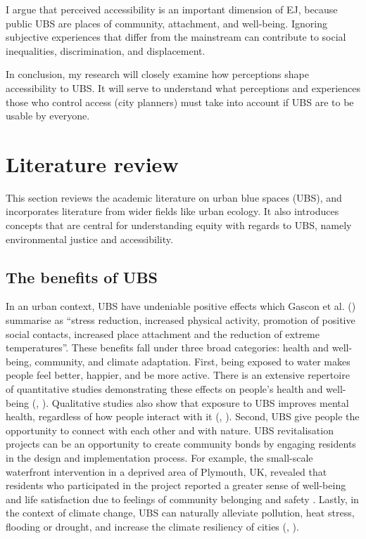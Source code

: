 \documentclass{article}
\begin{document}
I argue that perceived accessibility is an important dimension of EJ, because public UBS are places of community, attachment, and well-being. Ignoring subjective experiences that differ from the mainstream can contribute to social inequalities, discrimination, and displacement.

In conclusion, my research will closely examine how perceptions shape accessibility to UBS. It will serve to understand what perceptions and experiences those who control access (city planners) must take into account if UBS are to be usable by everyone.

\pagebreak
\section{Literature review}

This section reviews the academic literature on urban blue spaces (UBS), and incorporates literature from wider fields like urban ecology. It also introduces concepts that are central for understanding equity with regards to UBS, namely environmental justice and accessibility. 

\subsection{The benefits of UBS}

In an urban context, UBS have undeniable positive effects which Gascon et al. (\citeyear{gascon2017outdoor}) summarise as ``stress reduction, increased physical activity, promotion of positive social contacts, increased place attachment and the reduction of extreme temperatures''. These benefits fall under three broad categories: health and well-being, community, and climate adaptation.
First, being exposed to water makes people feel better, happier, and be more active. There is an extensive repertoire of quantitative studies demonstrating these effects on people's health and well-being (\cite{gascon2017outdoor}, \cite{britton2020blue}).
Qualitative studies also show that exposure to UBS improves mental health, regardless of how people interact with it (\cite{garrett2019urban}, \cite{van2021urban}).
Second, UBS give people the opportunity to connect with each other and with nature. UBS revitalisation projects can be an opportunity to create community bonds by engaging residents in the design and implementation process. For example, the small-scale waterfront intervention in a deprived area of Plymouth, UK, revealed that residents who participated in the project reported a greater sense of well-being and life satisfaction due to feelings of community belonging and safety \parencite{van2021urban}.
Lastly, in the context of climate change, UBS can naturally alleviate pollution, heat stress, flooding or drought, and increase the climate resiliency of cities (\cite{lin2020water}, \cite{o2021international}). 
\end{document}
